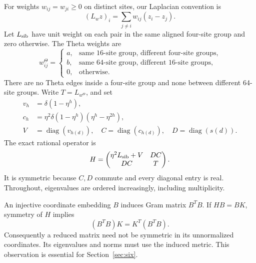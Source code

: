 \documentclass[journal,a4paper,10pt]{IEEEtran}
\theoremstyle{definition}\newtheorem{definition}[theorem]{Definition}
\theoremstyle{remark}\newtheorem{remark}[theorem]{Remark}
\newcommand{\diag}{\operatorname{diag}}
\begin{document}
For weights $w_{ij}=w_{ji}\geq0$ on distinct sites, our Laplacian convention is
\begin{equation}\label{eq:lap}
(L_w z)_i=\sum_{j\ne i}w_{ij}(z_i-z_j).
\end{equation}
Let $L_{\rm sib}$ have unit weight on each pair in the same aligned four-site group and zero otherwise. The Theta weights are
\begin{equation}\label{eq:weights}
w^\Theta_{ij}=\begin{cases}
a,&\text{same 16-site group, different four-site groups},\\
b,&\text{same 64-site group, different 16-site groups},\\
0,&\text{otherwise}.
\end{cases}
\end{equation}
There are no Theta edges inside a four-site group and none between different 64-site groups. Write $T=L_{w^\Theta}$, and set
\begin{align}
v_h&=\delta(1-\eta^h),\label{eq:v}\\
c_h&=\eta^2\delta(1-\eta^h)(\eta^h-\eta^{2h}),\label{eq:c}\\
V&=\diag(v_{h(d)}),\quad C=\diag(c_{h(d)}),\quad
D=\diag(s(d)).\nonumber
\end{align}
The exact rational operator is
\begin{equation}\label{eq:H}
H=\begin{pmatrix}\eta^2L_{\rm sib}+V&DC\\DC&T\end{pmatrix}.
\end{equation}
It is symmetric because $C,D$ commute and every diagonal entry is real. Throughout, eigenvalues are ordered increasingly, including multiplicity.

An injective coordinate embedding $B$ induces Gram matrix $B^TB$. If $HB=BK$, symmetry of $H$ implies
\begin{equation}\label{eq:metric}
(B^TB)K=K^T(B^TB).
\end{equation}
Consequently a reduced matrix need not be symmetric in its unnormalized coordinates. Its eigenvalues and norms must use the induced metric. This observation is essential for Section~\ref{sec:six}.
\end{document}
